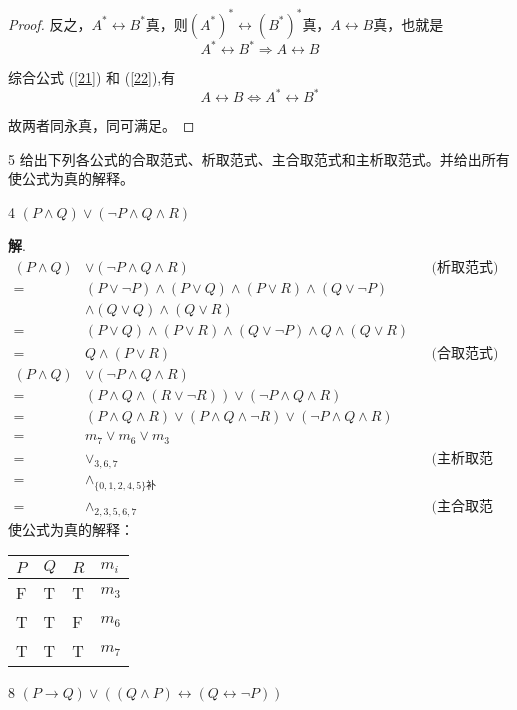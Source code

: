 \documentclass[12pt]{article}
\newenvironment{firstlayer}%
{\begin{list}{}{\renewcommand{\makelabel}[1]{\textbf{##1}.\hfil}
}}
{\end{list}}
\newenvironment{secondlayer}%
{\begin{list}{}{\renewcommand{\makelabel}[1]{(##1)\hfil}
}}
{\end{list}}
\begin{document}
\begin{CJK}{UTF8}{gbsn}
\begin{firstlayer}
\begin{secondlayer}
\begin{proof}
反之，\(A^*\leftrightarrow B^*\)真，则\((A^*)^*\leftrightarrow (B^*)^*\)真，\(A\leftrightarrow B\)真，也就是
\begin{equation}\label{22}
  A^*\leftrightarrow B^* \Rightarrow A\leftrightarrow B
\end{equation}

综合公式 (\ref{21}) 和 (\ref{22}),有
\begin{equation}
  A\leftrightarrow B \Leftrightarrow A^*\leftrightarrow B^*
\end{equation}

故两者同永真，同可满足。
\end{proof}
\end{secondlayer}
\item[5]给出下列各公式的合取范式、析取范式、主合取范式和主析取范式。并给出所有使公式为真的解释。
\begin{secondlayer}
  \item[4]\((P\wedge Q)\vee (\neg P\wedge Q \wedge R)\)
  
  \textbf{解}.
    \begin{align}
    (P\wedge Q)&\vee (\neg P\wedge Q \wedge R) &&\text{(析取范式)} \\
    =&(P\vee \neg P)\wedge (P \vee Q) \wedge (P \vee R) \wedge (Q\vee \neg P)\nonumber\\
    & \wedge (Q\vee Q)\wedge (Q\vee R) \nonumber \\
    =&(P\vee Q)\wedge (P\vee R)\wedge (Q\vee \neg P)\wedge Q\wedge (Q\vee R)\nonumber \\
    =&Q\wedge(P\vee R)&&\text{(合取范式)}\\
    (P\wedge Q)&\vee (\neg P\wedge Q \wedge R)\nonumber\\
    =&(P\wedge Q\wedge (R\vee \neg R))\vee (\neg P\wedge Q \wedge R) \nonumber \\
    =&(P\wedge Q\wedge R)\vee(P\wedge Q\wedge \neg R)\vee (\neg P\wedge Q \wedge R) \nonumber \\
    =&m_7\vee m_6\vee m_3\nonumber \\
    =&\vee_{3,6,7}&&\text{(主析取范式)}\\
    =&\wedge_{\{0,1,2,4,5\}\text{补}} \nonumber \\
    =&\wedge_{2,3,5,6,7}&&\text{(主合取范式)}
  \end{align}
  使公式为真的解释：

\begin{longtable}[]{@{}llll@{}}
\toprule
\(P\) & \(Q\) & \(R\) & \(m_i\)\tabularnewline
\midrule
\endhead
F & T & T & \(m_3\)\tabularnewline
T & T & F & \(m_6\)\tabularnewline
T & T & T & \(m_7\)\tabularnewline
\bottomrule
\end{longtable}
\newpage
\item[8] $(P\rightarrow Q)\vee ((Q\wedge P)\leftrightarrow (Q\leftrightarrow \neg P))$


\end{secondlayer}
\end{firstlayer}
\end{CJK}
\end{document}
